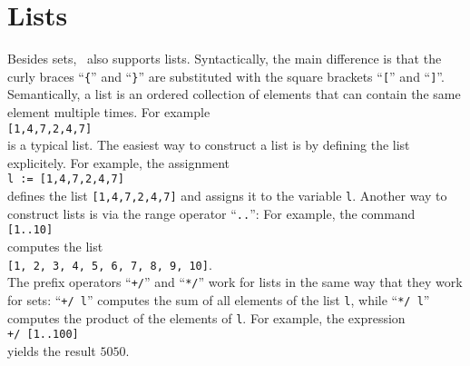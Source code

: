 \section{Lists}
Besides sets, \setlx\ also supports lists.  Syntactically, the main difference is that the
curly braces ``\texttt{\{}'' and ``\texttt{\}}'' are substituted with the square brackets
``\texttt{[}'' and ``\texttt{]}''.  Semantically, a list is an ordered collection of elements that 
can contain the same element multiple times.  For example
\\[0.2cm]
\hspace*{1.3cm}
\texttt{[1,4,7,2,4,7]}
\\[0.2cm]
is a typical list.  The easiest way to construct a list is by defining the list explicitely. For
example, the assignment
\\[0.2cm]
\hspace*{1.3cm}
\texttt{l := [1,4,7,2,4,7]}
\\[0.2cm]
defines the list \texttt{[1,4,7,2,4,7]} and assigns it to the variable \texttt{l}.
Another way to construct lists is via the range operator ``\texttt{..}'':
For example, the command
\\[0.2cm]
\hspace*{1.3cm}
\texttt{[1..10]}
\\[0.2cm]
computes the list
\\[0.2cm]
\hspace*{1.3cm}
\texttt{[1, 2, 3, 4, 5, 6, 7, 8, 9, 10]}.
\\[0.2cm]
The prefix operators ``\texttt{+/}'' and ``\texttt{*/}'' work for lists in the same way that they
work for sets: ``\texttt{+/ l}'' computes the sum of all elements of the list \texttt{l}, while
``\texttt{*/ l}'' computes the product of the elements of \texttt{l}.  For example, the expression
\\[0.2cm]
\hspace*{1.3cm}
\texttt{+/ [1..100]}
\\[0.2cm]
yields the result $5050$.

